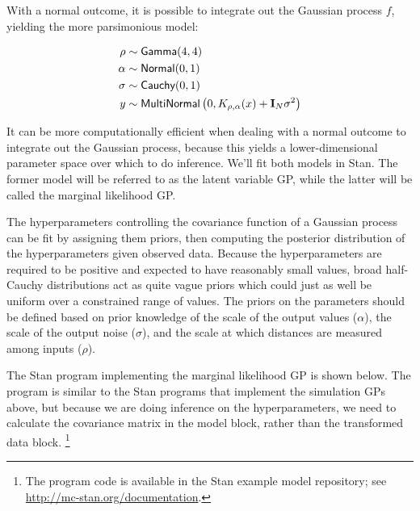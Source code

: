 With a normal outcome, it is possible to integrate out the Gaussian
process $f$, yielding the more parsimonious model:

\begin{align*}
  \rho & \sim \distro{Gamma}(4,4) \\
  \alpha & \sim \distro{Normal}(0, 1) \\
  \sigma & \sim \distro{Cauchy}(0, 1) \\
  y & \sim \distro{MultiNormal}
  \left(0, K_{\rho,\alpha}(x) + \mathbf{I}_N \sigma^2\right) \\
\end{align*}

It can be more computationally efficient when dealing with a normal 
outcome to integrate out the Gaussian process, because this yields a
lower-dimensional parameter space over which to do inference. We'll fit
both models in Stan. The former model will be referred to as the latent
variable GP, while the latter will be called the marginal likelihood
GP.

The hyperparameters controlling the covariance function of a Gaussian
process can be fit by assigning them priors, then computing the
posterior distribution of the hyperparameters given observed data.
Because the hyperparameters are required to be positive and expected
to have reasonably small values, broad half-Cauchy distributions act
as quite vague priors which could just as well be uniform over a
constrained range of values.  The priors on the parameters should be
defined based on prior knowledge of the scale of the output values
($\alpha$), the scale of the output noise ($\sigma$), and the scale at
which distances are measured among inputs ($\rho$).

The Stan program implementing the marginal likelihood GP is shown below. The
program is similar to the Stan programs that implement the simulation GPs
above, but because we are doing inference on the hyperparameters, we need to 
calculate the covariance matrix  in the model block, rather than
the transformed data block. 
%
\footnote{The program code is available in the Stan example model repository;
see \url{http://mc-stan.org/documentation}.}

